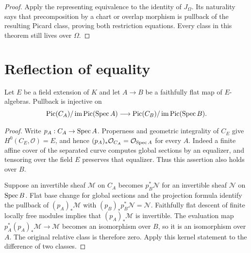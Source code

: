 \begin{proof}
  Apply the representing equivalence to the identity of \(J_\Omega\).  Its
  naturality says that precomposition by a chart or overlap morphism is
  pullback of the resulting Picard class, proving both restriction equations.
  Every class in this theorem still lives over \(\Omega\).
\end{proof}

\section{Reflection of equality}

\begin{lemma}
  \label{route-lem-relative-picard-reflection}

  Let \(E\) be a field extension of \(K\) and let \(A\to B\) be a
  faithfully flat map of \(E\)-algebras.  Pullback is injective on
  \[
    \operatorname{Pic}(C_A)/\operatorname{im}\operatorname{Pic}(\operatorname{Spec} A)
      \longrightarrow
    \operatorname{Pic}(C_B)/\operatorname{im}\operatorname{Pic}(\operatorname{Spec} B).
  \]
\end{lemma}

\begin{proof}
  Write \(p_A:C_A\to\operatorname{Spec} A\).  Properness and geometric integrality of
  \(C_E\) give \(H^0(C_E,\mathcal O)=E\), and hence
  \((p_A)_*\mathcal O_{C_A}=\mathcal O_{\operatorname{Spec} A}\) for every \(A\).
  Indeed a finite affine cover of the separated curve computes global
  sections by an equalizer, and tensoring over the field \(E\) preserves
  that equalizer.  Thus this assertion also holds over \(B\).

  Suppose an invertible sheaf \(\mathcal M\) on \(C_A\) becomes
  \(p_B^*\mathcal N\) for an invertible sheaf \(\mathcal N\) on
  \(\operatorname{Spec} B\).  Flat base change for global sections and the projection
  formula identify the pullback of \((p_A)_*\mathcal M\) with
  \((p_B)_*p_B^*\mathcal N=\mathcal N\).  Faithfully flat descent of
  finite locally free modules implies that \((p_A)_*\mathcal M\) is
  invertible.  The evaluation map
  \(p_A^*(p_A)_*\mathcal M\to\mathcal M\) becomes an isomorphism over
  \(B\), so it is an isomorphism over \(A\).  The original relative
  class is therefore zero.  Apply this kernel statement to the difference
  of two classes.
\end{proof}

